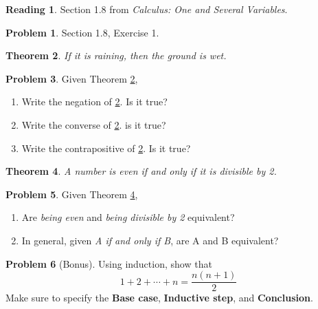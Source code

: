 \documentclass[letterpaper, 12pt]{article}
\theoremstyle{plain}
\newtheorem{theorem}{Theorem}[section]
\theoremstyle{definition}
\newtheorem{problem}[theorem]{Problem}
\newtheorem*{reading}{Reading}
\begin{document}
\begin{reading}
    Section 1.8 from \textit{Calculus: One and Several Variables}.
\end{reading}

\begin{problem}
    Section 1.8, Exercise 1.
\end{problem}

\begin{theorem}\label{Dummy1}
    If it is raining, then the ground is wet.
\end{theorem}

\begin{problem}
    Given Theorem \ref{Dummy1},
    \begin{enumerate}
        \item Write the negation of \ref{Dummy1}. Is it true?
        \item Write the converse of \ref{Dummy1}. is it true?
        \item Write the contrapositive of \ref{Dummy1}. Is it true?
    \end{enumerate}
\end{problem}

\begin{theorem}\label{Dummy2}
    A number is even if and only if it is divisible by 2.
\end{theorem}

\begin{problem}
    Given Theorem \ref{Dummy2}, 
    \begin{enumerate}
        \item Are \textit{being even} and \textit{being divisible by 2} equivalent?
        \item In general, given \textit{A if and only if B}, are A and B equivalent?
    \end{enumerate}
\end{problem}

\begin{problem}[Bonus]
    Using induction, show that
    $$
    1+2+\cdots+n = \frac{n(n+1)}{2}
    $$
    Make sure to specify the \textbf{Base case}, \textbf{Inductive step}, and \textbf{Conclusion}.
\end{problem}
\end{document}
